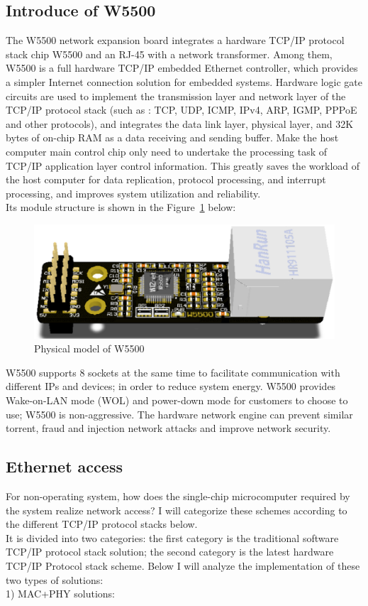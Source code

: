 \subsection{Introduce of W5500}
\label{sec:Introduce of W5500}
The W5500 network expansion board integrates a hardware TCP/IP protocol stack chip W5500 and an RJ-45 with a network transformer. Among them, W5500 is a full hardware TCP/IP embedded Ethernet controller, which provides a simpler Internet connection solution for embedded systems. Hardware logic gate circuits are used to implement the transmission layer and network layer of the TCP/IP protocol stack (such as : TCP, UDP, ICMP, IPv4, ARP, IGMP, PPPoE and other protocols), and integrates the data link layer, physical layer, and 32K bytes of on-chip RAM as a data receiving and sending buffer. Make the host computer main control chip only need to undertake the processing task of TCP/IP application layer control information. This greatly saves the workload of the host computer for data replication, protocol processing, and interrupt processing, and improves system utilization and reliability. 
\\
Its module structure is shown in the Figure~\ref{fig:2.6} below:
\\
\begin{figure}[h]
	\centering
	\includegraphics[width=15cm] {grafiken/2.6.eps}
	\caption{Physical model of W5500} 
	\label{fig:2.6}
\end{figure}
W5500 supports 8 sockets at the same time to facilitate communication with different IPs and devices; in order to reduce system energy. W5500 provides Wake-on-LAN mode (WOL) and power-down mode for customers to choose to use; W5500 is non-aggressive. The hardware network engine can prevent similar torrent, fraud and injection network attacks and improve network security.

\subsection{Ethernet access}
\label{sec:Ethernet access}
For non-operating system, how does the single-chip microcomputer required by the system realize network access? I will categorize these schemes according to the different TCP/IP protocol stacks below.
\\
It is divided into two categories: the first category is the traditional software TCP/IP protocol stack solution; the second category is the latest hardware TCP/IP
Protocol stack scheme. Below I will analyze the implementation of these two types of solutions: 
\\
1) MAC+PHY solutions:

